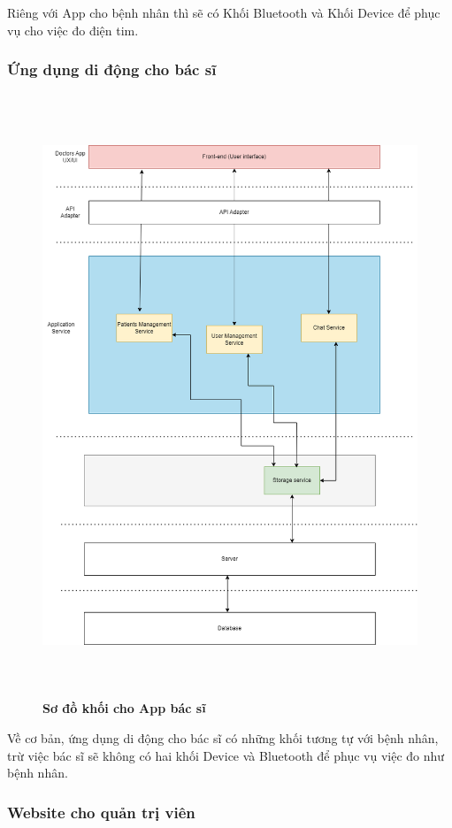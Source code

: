Riêng với App cho bệnh nhân thì sẽ có Khối Bluetooth và Khối Device để phục vụ cho việc đo điện tim.
\subsubsection{Ứng dụng di động cho bác sĩ}

\begin{figure}[H]
  \centering
  \includegraphics[width=16cm,height=18cm]{Images/system/fmECG_architecture-Doctors.drawio.png}
  \caption[Sơ đồ khói cho App bác sĩ]{\bfseries \fontsize{12pt}{0pt}\selectfont Sơ đồ khối cho App bác sĩ}
  \label{fmECG_architecture-Doctors} %
\end{figure}

Về cơ bản, ứng dụng di động cho bác sĩ có những khối tương tự với bệnh nhân, trừ việc bác sĩ sẽ không có hai khối Device
và Bluetooth để phục vụ việc đo như bệnh nhân.


\subsubsection{Website cho quản trị viên}


